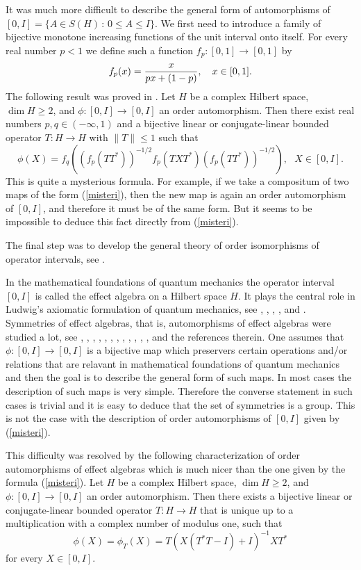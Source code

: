 \documentclass{article}
\begin{document}
It was much more difficult to describe the general form of automorphisms of $[0,I] = \{ A \in S(H)\, : \, 0 \le A \le I \}$. We first need to introduce a family of bijective monotone increasing functions of the
unit interval onto itself. For every real number $p < 1$ we define such a function $f_p :[0,1] \to [0,1]$ by
$$
f_p (x) = {x \over px + (1-p)}, \ \ \ x \in [0,1].
$$
The following result was proved in \cite{Se0, Se1}.
Let $H$ be a complex Hilbert space,
$\dim H \ge 2$, and $\phi : [0,I] \to [0,I]$ an order automorphism.
Then there exist real numbers $p,q \in (-\infty , 1)$ and a bijective linear or conjugate-linear bounded operator
$T : H \to H$ with $\| T \| \le 1$ such that 
\begin{equation}\label{misteri}
\phi (X) = f_q \left( \left( f_p (TT^* ) \right) ^{-1/2} f_p (TXT^*) \left( f_p (TT^* ) \right) ^{-1/2} \right), \ \ \
X \in [0,I].
\end{equation}
This is quite a mysterious formula. For example, if we take a compositum of two maps of the form (\ref{misteri}), then the new map is again an order automorphism of $[0,I]$, and therefore it must be of the same form. But it seems to be impossible to deduce this fact directly from (\ref{misteri}). 

The final step was to develop the general theory of order isomorphisms of operator intervals, see \cite{Se6}. 

In the mathematical foundations of quantum mechanics the operator interval $[0,I]$ is called the effect algebra on a Hilbert space $H$. It plays the central role in Ludwig's axiomatic formulation of quantum mechanics, see \cite{BLPY}, \cite{Dav}, \cite{Kraus}, \cite{LudI}, and \cite{LudII}. Symmetries of effect algebras, that is, automorphisms of effect algebras were studied a lot, see \cite{DoM}, \cite{GeS}, \cite{HKX}, \cite{Moln1}, \cite{Mo2}, \cite{MoK}, \cite{MoN}, \cite{MoP}, \cite{MoS}, \cite{Se0}, \cite{Se1}, \cite{Se4}, and the references therein. One assumes that $\phi : [0,I] \to [0,I]$ is a bijective map which preservers certain operations and/or relations that are relavant in mathematical foundations of quantum mechanics and then the goal is to describe the general form of such maps. In most cases the description of such maps is very simple. Therefore the converse statement in such cases is trivial and it is easy to deduce that the set of symmetries is a group. This is not the case with the description of order automorphisms of $[0,I]$ given by (\ref{misteri}). 

This difficulty was resolved by the following characterization of order automorphisms of effect algebras \cite[Theorem 7.3]{MS} which is much nicer than the one given by the formula (\ref{misteri}).
Let $H$ be a complex Hilbert space, $\dim H \ge 2$, and $\phi : [0, I] \to [0, I]$ an order automorphism.
Then there exists a bijective linear or conjugate-linear bounded operator
$T: H\to H$ that is unique up to a multiplication with a complex number of modulus one, such that 
\begin{equation}\label{nice}
\phi (X) = \phi_T (X) = T \left( X (T^\ast T -I) +I \right)^{-1} X T^\ast
\end{equation}
for every
$X \in [0,I]$.
\end{document}
